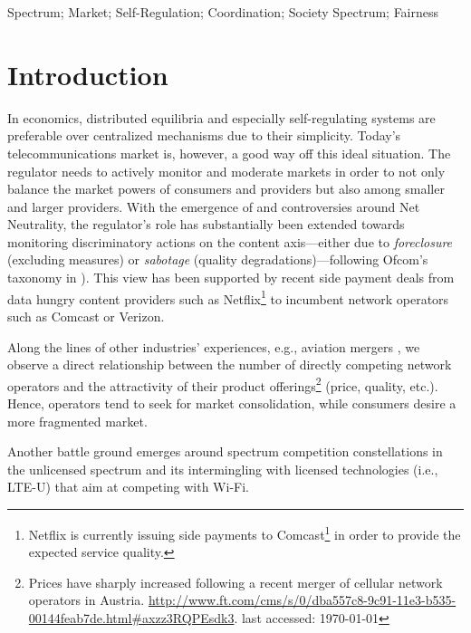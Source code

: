 \documentclass[conference]{IEEEtran}
\begin{document}
\begin{keywords}
Spectrum; Market; Self-Regulation; Coordination; Society Spectrum; Fairness
\end{keywords}

\IEEEpeerreviewmaketitle


\section{Introduction}
\label{introduction}

In economics, distributed equilibria and especially self-regulating systems are preferable over centralized mechanisms due to their simplicity. Today's telecommunications market is, however, a good way off this ideal situation. The regulator needs to actively monitor and moderate markets in order to not only balance the market powers of consumers and providers but also among smaller and larger providers. With the emergence of and controversies around Net Neutrality, the regulator's role has substantially been extended towards monitoring discriminatory actions on the content axis---either due to \textit{foreclosure} (excluding measures) or \textit{sabotage} (quality degradations)---following Ofcom's taxonomy in \cite{croicioni}). This view has been supported by recent side payment deals from data hungry content providers such as Netflix\footnote{Netflix is currently issuing side payments to Comcast\footnote{\url{http://time.com/80192/netflix-verizon-paid-peering-agreement/}, last accessed: \today} in order to provide the expected service quality.} to incumbent network operators such as Comcast or Verizon.

Along the lines of other industries' experiences, e.g., aviation mergers \cite{borenstein1990airline}, we observe a direct relationship between the number of directly competing network operators and the attractivity of their product offerings\footnote{Prices have sharply increased following a recent merger of cellular network operators in Austria. \url{http://www.ft.com/cms/s/0/dba557c8-9c91-11e3-b535-00144feab7de.html#axzz3RQPEsdk3}. last accessed: \today} (price, quality, etc.). Hence, operators tend to seek for market consolidation, while consumers desire a more fragmented market. 
	


	


Another battle ground \cite{zwickl2013wi} emerges around spectrum competition constellations in the unlicensed spectrum and its intermingling with licensed technologies (i.e., LTE-U) that aim at competing with Wi-Fi.
	 
\end{document}
